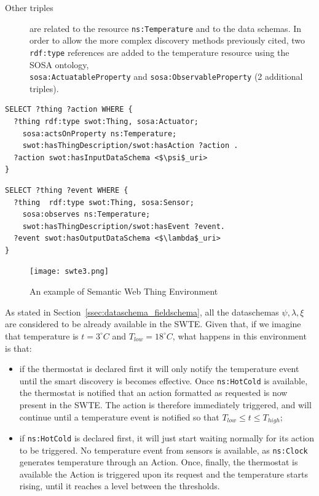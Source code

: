 \begin{description}
    \item[Other triples] are related to the resource \texttt{ns:Temperature} and to the data schemas. In order to allow the more complex discovery methods previously cited, two \texttt{rdf:type} references are added to the temperature resource using the SOSA ontology,\\ \texttt{sosa:ActuatableProperty} and \texttt{sosa:ObservableProperty} (2 additional triples).
\end{description}

\begin{lstlisting}[caption={Smart discovery for Web Things with an Action acting on temperature and requiring a $\psi$-formatted input}, label=listing:smart_discovery1, mathescape]
SELECT ?thing ?action WHERE {
  ?thing rdf:type swot:Thing, sosa:Actuator;
    sosa:actsOnProperty ns:Temperature;
    swot:hasThingDescription/swot:hasAction ?action .
  ?action swot:hasInputDataSchema <$\psi$_uri>
}
\end{lstlisting}

\begin{lstlisting}[caption={Smart discovery for Web Things that are \texttt{ns:Temperature} sensors triggering Events with $\lambda$-formatted output}, label=listing:smart_discovery2, mathescape]
SELECT ?thing ?event WHERE { 
  ?thing  rdf:type swot:Thing, sosa:Sensor;
    sosa:observes ns:Temperature;
    swot:hasThingDescription/swot:hasEvent ?event.
  ?event swot:hasOutputDataSchema <$\lambda$_uri> 
}
\end{lstlisting}

\begin{figure}[h!]
    \centering
    \texttt{[image: swte3.png]}
    \caption{An example of Semantic Web Thing Environment}
    \label{fig:swte}
\end{figure}

As stated in Section~\ref{ssec:dataschema_fieldschema}, all the dataschemas $\psi, \lambda, \xi$ are considered to be already available in the SWTE. Given that, if we imagine that temperature is $t=3^{\circ}C$ and $T_{low}=18^{\circ}C$, what happens in this environment is that:
\begin{itemize}
    \item if the thermostat is declared first it will only notify the temperature event until the smart discovery is becomes effective. Once \texttt{ns:HotCold} is available, the thermostat is notified that an action formatted as requested is now present in the SWTE. The action is therefore immediately triggered, and will continue until a temperature event is notified so that $T_{low} \le t \le T_{high}$;
    \item if \texttt{ns:HotCold} is declared first, it will just start waiting normally for its action to be triggered. No temperature event from sensors is available, as \texttt{ns:Clock} generates temperature through an Action. Once, finally, the thermostat is available the Action is triggered upon its request and the temperature starts rising, until it reaches a level between the thresholds.
\end{itemize}


